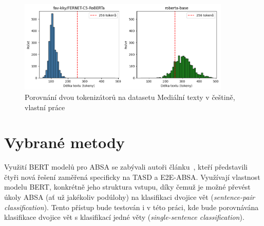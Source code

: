 \begin{figure}[ht]
    \centering
    \includegraphics[width=0.9\textwidth]{images/CzechmediaToken}
    \caption[Porovnání dvou tokenizátorů na datasetu Mediální texty v češtině]%
    {Porovnání dvou tokenizátorů na datasetu Mediální texty v češtině, vlastní práce}
    \label{fig:CzechMediaToken}
\end{figure}

\section{Vybrané metody}\label{VybMet}
Využití BERT modelů pro ABSA se zabývali autoři článku~\cite{sun-etal-2019-utilizing}, kteří představili čtyři nová řešení zaměřená specificky na TASD a E2E-ABSA. Využívají vlastnost modelu BERT, konkrétně jeho struktura vstupu, díky čemuž je možné převést úkoly ABSA (ať už jakékoliv podúlohy) na klasifikaci dvojice vět (\emph{sentence-pair classification}). Tento přístup bude testován i v této práci, kde bude porovnávána klasifikace dvojice vět s klasifikací jedné věty (\emph{single-sentence classification}).

